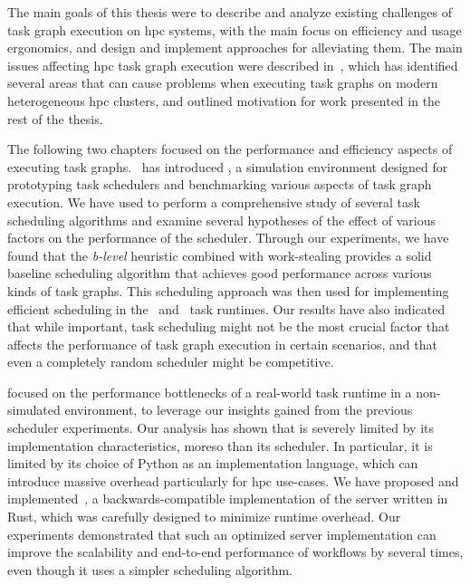 The main goals of this thesis were to describe and analyze existing challenges of task graph
execution on \gls{hpc} systems, with the main focus on efficiency and usage
ergonomics, and design and implement approaches for alleviating them. The main issues affecting
\gls{hpc} task graph execution were described in~, which
has identified several areas that can cause problems when executing task graphs on modern
heterogeneous \gls{hpc} clusters, and outlined motivation for work presented in
the rest of the thesis.

The following two chapters focused on the performance and efficiency aspects of executing task
graphs.~ has introduced \estee{}, a simulation
environment designed for prototyping task schedulers and benchmarking various aspects of task graph
execution. We have used \estee{} to perform a comprehensive study of several task
scheduling algorithms and examine several hypotheses of the effect of various factors on the
performance of the scheduler. Through our experiments, we have found that the
\emph{b-level} heuristic combined with work-stealing provides a solid baseline
scheduling algorithm that achieves good performance across various kinds of task graphs. This
scheduling approach was then used for implementing efficient scheduling in
the~\rsds{} and~\hyperqueue{} task runtimes. Our results have also
indicated that while important, task scheduling might not be the most crucial factor that affects
the performance of task graph execution in certain scenarios, and that even a completely random
scheduler might be competitive.

 focused on the performance bottlenecks of a real-world task runtime
\dask{} in a non-simulated
environment, to leverage our insights gained from the previous scheduler experiments. Our analysis
has shown that \dask{} is severely limited by its implementation
characteristics, moreso than its scheduler. In particular, it is limited by its choice of Python as
an implementation language, which can introduce massive overhead particularly for
\gls{hpc} use-cases. We have proposed and implemented~\rsds{},
a backwards-compatible implementation of the \dask{} server written in Rust,
which was carefully designed to minimize runtime overhead. Our experiments demonstrated that such
an optimized server implementation can improve the scalability and end-to-end performance of
\dask{} workflows by several times, even though it uses a simpler scheduling
algorithm.

